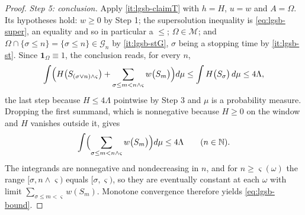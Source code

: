 \begin{proof}
\emph{Step 5: conclusion.} Apply \ref{it:lgsb-claimT} with $h=H$, $u=w$ and
$A=\Omega$. Its hypotheses hold: $w\ge0$ by Step 1; the supersolution
inequality is \eqref{eq:lgsb-super}, an equality and so in particular a
$\le$; $\Omega\in\mathcal M$; and $\Omega\cap\{\sigma\le n\}=\{\sigma\le n\}
\in\mathcal G_n$ by \ref{it:lgsb-stG}, $\sigma$ being a stopping time by
\ref{it:lgsb-st}. Since $\mathbf1_\Omega\equiv1$, the conclusion reads, for
every $n$,
\[
  \int\Bigl(H\bigl(S_{(\sigma\vee n)\wedge\varsigma}\bigr)
    +\sum_{\sigma\le m<n\wedge\varsigma}w\bigl(S_m\bigr)\Bigr)d\mu
  \le\int H\bigl(S_\sigma\bigr)\,d\mu\le4\Lambda ,
\]
the last step because $H\le4\Lambda$ pointwise by Step 3 and $\mu$ is a
probability measure. Dropping the first summand, which is nonnegative because
$H\ge0$ on the window and $H$ vanishes outside it, gives
\[
  \int\Bigl(\sum_{\sigma\le m<n\wedge\varsigma}w\bigl(S_m\bigr)\Bigr)d\mu
   \le4\Lambda\qquad(n\in\mathbb{N}).
\]
The integrands are nonnegative and nondecreasing in $n$, and for
$n\ge\varsigma(\omega)$ the range $[\sigma,n\wedge\varsigma)$ equals
$[\sigma,\varsigma)$, so they are eventually constant at each $\omega$ with
limit $\sum_{\sigma\le m<\varsigma}w(S_m)$. Monotone convergence therefore
yields \eqref{eq:lgsb-bound}.
\end{proof}

